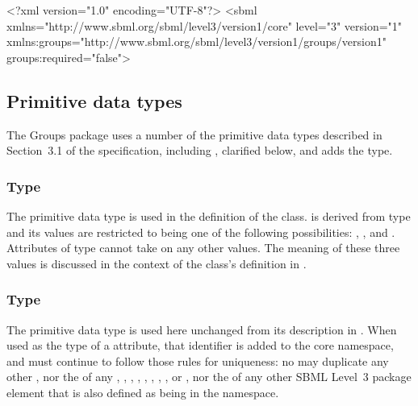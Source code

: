 \begin{example}
<?xml version="1.0" encoding="UTF-8"?>
<sbml xmlns="http://www.sbml.org/sbml/level3/version1/core" level="3" version="1"
      xmlns:groups="http://www.sbml.org/sbml/level3/version1/groups/version1"
      groups:required="false">
\end{example}


\subsection{Primitive data types}
\label{new-primitive-types}

The Groups package uses a number of the primitive data types described in Section~3.1 of the \sbmlthreecore specification, including , clarified below, and adds the  type.


\subsubsection{Type \fixttspace{}}
\label{primtype-groupkind}

The  primitive data type is used in the definition of the \Group class.   is derived from type  and its values are restricted to being one of the following possibilities: , , and .  Attributes of type  cannot take on any other values.  The meaning of these three values is discussed in the context of the \Group class's definition in .


\subsubsection{Type \fixttspace{}}
\label{primtype-sid}

The  primitive data type is used here unchanged from its description in \sbmlthreecore.  When used as the type of a  attribute, that identifier is added to the core  namespace, and must continue to follow those rules for uniqueness: no  may duplicate any other , nor the  of any \Model, \FunctionDefinition, \Compartment, \Species, \Reaction, \SpeciesReference, \ModifierSpeciesReference, \Event, or \Parameter, nor the  of any other SBML Level~3 package element that is also defined as being in the  namespace.


